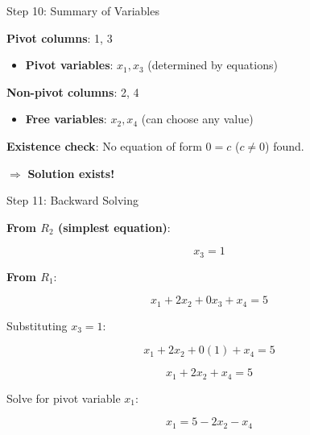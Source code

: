 \documentclass[10pt]{beamer}
\theoremstyle{definition}
\newcommand{\x}[1]{\alert{\textbf{#1}}}
\begin{document}
\begin{frame}{Step 10: Summary of Variables}

\x{Pivot columns}: 1, 3

\begin{itemize}
\item \x{Pivot variables}: $x_1, x_3$ (determined by equations)
\end{itemize}

\vspace{1em}

\x{Non-pivot columns}: 2, 4

\begin{itemize}
\item \x{Free variables}: $x_2, x_4$ (can choose any value)
\end{itemize}

\vspace{1em}

\x{Existence check}: No equation of form $0 = c$ ($c \neq 0$) found.

$\Rightarrow$ \textbf{Solution exists!}

\end{frame}

\begin{frame}{Step 11: Backward Solving}

\x{From $R_2$ (simplest equation)}:

$$x_3 = 1$$

\vspace{1em}

\x{From $R_1$}:

$$x_1 + 2x_2 + 0x_3 + x_4 = 5$$

Substituting $x_3 = 1$:

$$x_1 + 2x_2 + 0(1) + x_4 = 5$$

$$x_1 + 2x_2 + x_4 = 5$$

Solve for pivot variable $x_1$:

$$x_1 = 5 - 2x_2 - x_4$$

\end{frame}
\end{document}
